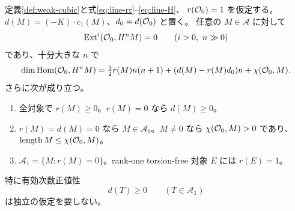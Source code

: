 \begin{theorem}\label{thm:ac-serre-positivity}
定義\ref{def:weak-cubic}と式\eqref{eq:line-rr}--\eqref{eq:line-H}、
$r(\mathcal O_0)=1$ を仮定する。$d(M)=(-K)\cdot c_1(M)$、$d_0=d(\mathcal O_0)$ と置く。
任意の $M\in\mathcal A$ に対して
\begin{equation}\label{eq:ac-serre-vanishing}
 \operatorname{Ext}^i(\mathcal O_0,H^nM)=0\qquad(i>0,\ n\gg0)
\end{equation}
であり、十分大きな $n$ で
\begin{equation}\label{eq:ac-hilbert-polynomial}
 \dim\operatorname{Hom}(\mathcal O_0,H^nM)
 =\tfrac32r(M)n(n+1)+(d(M)-r(M)d_0)n+\chi(\mathcal O_0,M).
\end{equation}
さらに次が成り立つ。
\begin{enumerate}
\item 全対象で $r(M)\ge0$。$r(M)=0$ なら $d(M)\ge0$。
\item $r(M)=d(M)=0$ なら $M\in\mathcal A_0$。$M\ne0$ なら
      $\chi(\mathcal O_0,M)>0$ であり、$\operatorname{length}M\le\chi(\mathcal O_0,M)$。
\item $\mathcal A_1=\{M:r(M)=0\}$。rank-one torsion-free 対象 $E$ には $r(E)=1$。
\end{enumerate}
特に有効次数正値性
\begin{equation}\label{eq:effective-degree-positivity}
 d(T)\ge0\qquad(T\in\mathcal A_1) \tag{EP}
\end{equation}
は独立の仮定を要しない。
\end{theorem}
